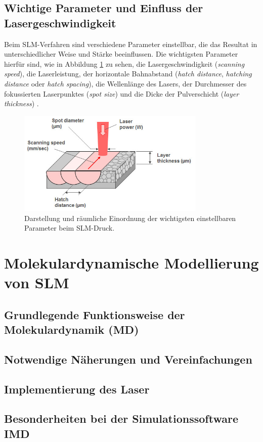 	\subsection{Wichtige Parameter und Einfluss der Lasergeschwindigkeit}
		Beim SLM-Verfahren sind verschiedene Parameter einstellbar, die das Resultat in
		unterschiedlicher Weise und Stärke beeinflussen. Die wichtigsten Parameter hierfür sind,
		wie in Abbildung \ref{fig:slm_parameters} zu sehen, die Lasergeschwindigkeit
		(\emph{scanning speed}), die Laserleistung, der horizontale Bahnabstand
		(\emph{hatch distance}, \emph{hatching distance} oder \emph{hatch spacing}), die
		Wellenlänge des Lasers, der Durchmesser des fokussierten Laserpunktes
		(\emph{spot size}) und die Dicke der Pulverschicht (\emph{layer thickness})
		\cite{sadali2020influence}.

		\begin{figure}[ht]
			\centering
			\includegraphics[width=0.8\textwidth]{chapter/main/img/slm_parameters.jpg}
			\caption{Darstellung und räumliche Einordnung der wichtigsten einstellbaren Parameter
			beim SLM-Druck. \cite{saunders2017x}}
			\label{fig:slm_parameters}
		\end{figure}


\section{Molekulardynamische Modellierung von SLM}
	\subsection{Grundlegende Funktionsweise der Molekulardynamik (MD)}
	\subsection{Notwendige Näherungen und Vereinfachungen}
	\subsection{Implementierung des Laser}
	\subsection{Besonderheiten bei der Simulationssoftware IMD}
